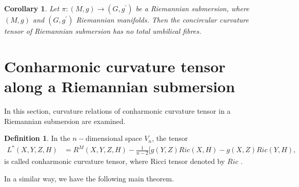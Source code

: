 \documentclass{birkjour}
\newtheorem{corollary}[theorem]{Corollary}
\theoremstyle{definition}
\newtheorem{definition}[theorem]{Definition}
\theoremstyle{remark}
\numberwithin{equation}{section}
\begin{document}
\begin{corollary}
Let $\pi: (M, g) \to(G, g^\prime)$ be a Riemannian submersion, where $(M, g)$ and $(G, g^\prime)$ Riemannian manifolds. Then
the concircular curvature tensor of Riemannian submersion has no total umbilical fibres.
\end{corollary}


\section{Conharmonic curvature tensor along a Riemannian submersion}
In this section, curvature relations of conharmonic curvature tensor in a Riemannian submersion are examined.
\begin{definition}\rm \label{defconhar}
	In the $n-$dimensional space $V_n$, the tensor
	\begin{align*}
		L^*(X,Y,Z,H)&= R^M(X,Y,Z,H)- \frac{1}{n-2}[g(Y,Z)Ric(X,H)-g(X,Z)Ric(Y,H),
	\end{align*}
	is called conharmonic curvature tensor, where Ricci tensor denoted by $Ric$ \cite{mishra}.
\end{definition}
In a similar way, we have the following main theorem.
\end{document}

